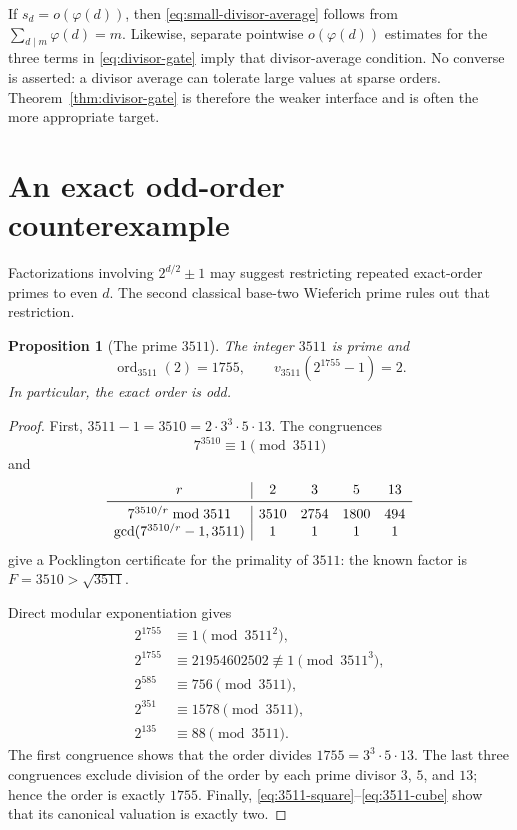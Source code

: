 \documentclass[11pt]{article}
\newtheorem{proposition}[theorem]{Proposition}
\theoremstyle{remark}
\DeclareMathOperator{\ord}{ord}
\begin{document}
If $s_d=o(\varphi(d))$, then \eqref{eq:small-divisor-average} follows from
$\sum_{d\mid m}\varphi(d)=m$.  Likewise, separate pointwise
$o(\varphi(d))$ estimates for the three terms in
\eqref{eq:divisor-gate} imply that divisor-average condition.  No converse
is asserted: a divisor average can tolerate large values at sparse orders.
Theorem~\ref{thm:divisor-gate} is therefore the weaker interface and is
often the more appropriate target.

\section{An exact odd-order counterexample}
\label{sec:3511}

Factorizations involving $2^{d/2}\pm1$ may suggest restricting repeated
exact-order primes to even $d$.  The second classical base-two Wieferich
prime rules out that restriction.

\begin{proposition}[The prime $3511$]
\label{prop:3511}
The integer $3511$ is prime and
\begin{equation}
   \ord_{3511}(2)=1755,
   \qquad
   v_{3511}(2^{1755}-1)=2.
 \label{eq:3511-conclusion}
\end{equation}
In particular, the exact order is odd.
\end{proposition}

\begin{proof}
First, $3511-1=3510=2\cdot3^3\cdot5\cdot13$.  The congruences
\[
 7^{3510}\equiv1\pmod{3511}
\]
and
\[
\begin{array}{c|cccc}
 r&2&3&5&13\\ \midrule
 7^{3510/r}\bmod3511&3510&2754&1800&494\\
 \gcd(7^{3510/r}-1,3511)&1&1&1&1
\end{array}
\]
give a Pocklington certificate for the primality of $3511$: the known
factor is $F=3510>\sqrt{3511}$.

Direct modular exponentiation gives
\begin{align}
 2^{1755}&\equiv1\pmod {3511^2},
 \label{eq:3511-square}\\
 2^{1755}&\equiv21954602502\not\equiv1\pmod {3511^3},
 \label{eq:3511-cube}\\
 2^{585}&\equiv756\pmod {3511},\\
 2^{351}&\equiv1578\pmod {3511},\\
 2^{135}&\equiv88\pmod {3511}.
 \label{eq:3511-order-checks}
\end{align}
The first congruence shows that the order divides
$1755=3^3\cdot5\cdot13$.  The last three congruences exclude division of
the order by each prime divisor $3$, $5$, and $13$; hence the order is
exactly $1755$.  Finally,
\eqref{eq:3511-square}--\eqref{eq:3511-cube} show that its canonical
valuation is exactly two.
\end{proof}
\end{document}
